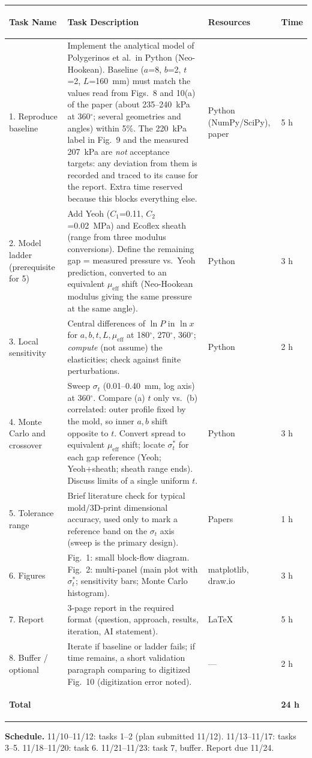 \documentclass[12pt,letterpaper]{article}
\newcommand{\meff}{\mu_{\mathrm{eff}}}
\begin{document}
\footnotesize\renewcommand{\arraystretch}{1.05}
\begin{tabular}{|>{\bfseries\raggedright}p{1.05in}|p{3.9in}|p{1.0in}|p{0.45in}|}
\hline
Task Name & \textbf{Task Description} & \textbf{Resources} & \textbf{Time} \\ \hline
1. Reproduce baseline & Implement the analytical model of Polygerinos et al.\ in Python (Neo-Hookean). Baseline ($a$=8, $b$=2, $t$=2, $L$=160~mm) must match the values read from Figs.~8 and 10(a) of the paper (about 235--240~kPa at 360$^\circ$; several geometries and angles) within 5\%. The 220~kPa label in Fig.~9 and the measured 207~kPa are \emph{not} acceptance targets: any deviation from them is recorded and traced to its cause for the report. Extra time reserved because this blocks everything else. & Python (NumPy/SciPy), paper & 5 h \\ \hline
2. Model ladder (prerequisite for 5) & Add Yeoh ($C_1$=0.11, $C_2$=0.02~MPa) and Ecoflex sheath (range from three modulus conversions). Define the remaining gap = measured pressure vs.\ Yeoh prediction, converted to an equivalent $\meff$ shift (Neo-Hookean modulus giving the same pressure at the same angle). & Python & 3 h \\ \hline
3. Local sensitivity & Central differences of $\ln P$ in $\ln x$ for $a,b,t,L,\meff$ at 180$^\circ$, 270$^\circ$, 360$^\circ$; \emph{compute} (not assume) the elasticities; check against finite perturbations. & Python & 2 h \\ \hline
4. Monte Carlo and crossover & Sweep $\sigma_t$ (0.01--0.40~mm, log axis) at 360$^\circ$. Compare (a) $t$ only vs.\ (b) correlated: outer profile fixed by the mold, so inner $a,b$ shift opposite to $t$. Convert spread to equivalent $\meff$ shift; locate $\sigma_t^*$ for each gap reference (Yeoh; Yeoh+sheath; sheath range ends). Discuss limits of a single uniform $t$. & Python & 3 h \\ \hline
5. Tolerance range & Brief literature check for typical mold/3D-print dimensional accuracy, used only to mark a reference band on the $\sigma_t$ axis (sweep is the primary design). & Papers & 1 h \\ \hline
6. Figures & Fig.~1: small block-flow diagram. Fig.~2: multi-panel (main plot with $\sigma_t^*$; sensitivity bars; Monte Carlo histogram). & matplotlib, draw.io & 3 h \\ \hline
7. Report & 3-page report in the required format (question, approach, results, iteration, AI statement). & \LaTeX & 5 h \\ \hline
8. Buffer / optional & Iterate if baseline or ladder fails; if time remains, a short validation paragraph comparing to digitized Fig.~10 (digitization error noted). & --- & 2 h \\ \hline
\textbf{Total} & & & \textbf{24 h} \\ \hline
\end{tabular}

\small\textbf{Schedule.} 11/10--11/12: tasks 1--2 (plan submitted 11/12). 11/13--11/17: tasks 3--5. 11/18--11/20: task 6. 11/21--11/23: task 7, buffer. Report due 11/24.
\end{document}
